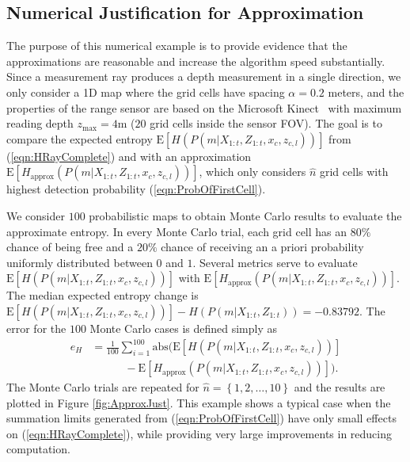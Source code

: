 \documentclass[smallextended]{svjour3}       %
\newcommand{\braces}[1]{\ensuremath{\left\{ #1 \right\}}}
\newcommand{\refeqn}[1]{(\ref{eqn:#1})}
\begin{document}
\subsection{Numerical Justification for Approximation}

The purpose of this numerical example is to provide evidence that the approximations are reasonable and increase the algorithm speed substantially.
Since a measurement ray produces a depth measurement in a single direction, we only consider a 1D map where the grid cells have spacing $\alpha=0.2$ meters, and the properties of the range sensor are based on the Microsoft Kinect~\cite{PirRutBisSch11,KhoElb12} with maximum reading depth $z_\text{max}=4$m ($20$ grid cells inside the sensor FOV). The goal is to compare the expected entropy $\text{E}[H(P(m|X_{1:t},Z_{1:t},x_c,z_{c,l}))]$ from \refeqn{HRayComplete} and with an approximation $\text{E}[H_\text{approx}(P(m|X_{1:t},Z_{1:t},x_c,z_{c,l}))]$, which only considers $\hat n$ grid cells with highest detection probability \refeqn{ProbOfFirstCell}.

We consider $100$ probabilistic maps to obtain Monte Carlo results to evaluate the approximate entropy. In every Monte Carlo trial, each grid cell has an $80\%$ chance of being free and a $20\%$ chance of receiving an a priori probability uniformly distributed between $0$ and $1$. 
Several metrics serve to evaluate $\text{E}[H(P(m|X_{1:t},Z_{1:t},x_c,z_{c,l}))]$ with $\text{E}[H_\text{approx}(P(m|X_{1:t},Z_{1:t},x_c,z_{c,l}))]$. The median expected entropy change is $\text{E}[H(P(m|X_{1:t},Z_{1:t},x_c,z_{c,l}))]-H(P(m|X_{1:t},Z_{1:t}))=-0.83792$. The error for the $100$ Monte Carlo cases is defined simply as
\begin{align}
e_{H}&=\frac1{100}\sum_{i=1}^{100}\text{abs}\bigg(\text{E}[H(P(m|X_{1:t},Z_{1:t},x_c,z_{c,l}))]\nonumber\\&\qquad\quad-\text{E}[H_\text{approx}(P(m|X_{1:t},Z_{1:t},x_c,z_{c,l}))]\bigg).
\end{align}
The Monte Carlo trials are repeated for $\hat n=\braces{1,2,\ldots,10}$ and the results are plotted in Figure \ref{fig:ApproxJust}.
This example shows a typical case when the summation limits generated from \refeqn{ProbOfFirstCell} have only small effects on \refeqn{HRayComplete}, while providing very large improvements in reducing computation.
\end{document}
